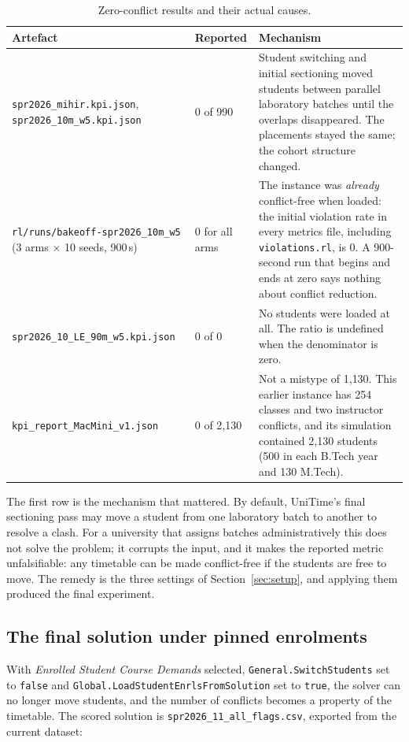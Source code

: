 \begin{table}[H]
\centering
\caption{Zero-conflict results and their actual causes.}
\label{tab:zeros}
\footnotesize
\begin{tabular}{@{}L{4.6cm}L{3.0cm}L{6.8cm}@{}}
\toprule
\textbf{Artefact} & \textbf{Reported} & \textbf{Mechanism} \\
\midrule
\texttt{spr2026\_mihir.kpi.json}, \texttt{spr2026\_10m\_w5.kpi.json}
  & 0 of 990
  & Student switching and initial sectioning moved students between parallel laboratory batches
    until the overlaps disappeared. The placements stayed the same; the cohort structure changed. \\
\texttt{rl/runs/bakeoff-spr2026\_10m\_w5} (3 arms $\times$ 10 seeds, 900\,s)
  & 0 for all arms
  & The instance was \emph{already} conflict-free when loaded: the initial violation rate in every
    metrics file, including \texttt{violations.rl}, is 0. A 900-second run that begins and ends at
    zero says nothing about conflict reduction. \\
\texttt{spr2026\_10\_LE\_90m\_w5.kpi.json}
  & 0 of 0
  & No students were loaded at all. The ratio is undefined when the denominator is zero. \\
\texttt{kpi\_report\_MacMini\_v1.json}
  & 0 of 2{,}130
  & Not a mistype of 1{,}130. This earlier instance has 254 classes and two instructor conflicts,
    and its simulation contained 2{,}130 students (500 in each B.Tech year and 130 M.Tech). \\
\bottomrule
\end{tabular}
\end{table}

The first row is the mechanism that mattered. By default, UniTime's final sectioning pass may move
a student from one laboratory batch to another to resolve a clash. For a university that assigns
batches administratively this does not solve the problem; it corrupts the input, and it makes the
reported metric unfalsifiable: any timetable can be made conflict-free if the students are free to
move. The remedy is the three settings of Section~\ref{sec:setup}, and applying them produced the
final experiment.

\subsection{The final solution under pinned enrolments}

With \emph{Enrolled Student Course Demands} selected, \texttt{General.SwitchStudents} set to
\texttt{false} and \texttt{Global.LoadStudentEnrlsFromSolution} set to \texttt{true}, the solver
can no longer move students, and the number of conflicts becomes a property of the timetable. The
scored solution is \texttt{spr2026\_11\_all\_flags.csv}, exported from the current dataset:

